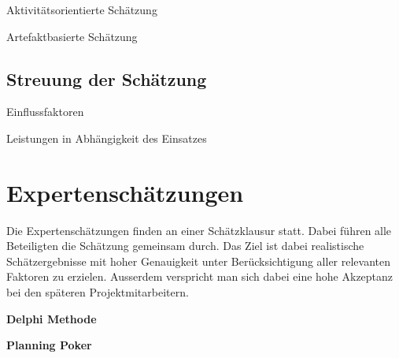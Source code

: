 \begin{minipage}{8cm}
	Aktivitätsorientierte Schätzung
\end{minipage}
\begin{minipage}{7cm}
	Artefaktbasierte Schätzung
\end{minipage}

\begin{figure}[ht]
	\centering
\end{figure}

\subsection{Streuung der Schätzung}

\begin{minipage}{8cm}
	Einflussfaktoren
\end{minipage}
\begin{minipage}{7cm}
	Leistungen in Abhängigkeit des Einsatzes
\end{minipage}

\begin{figure}[ht]
	\centering
\end{figure}

\section{Expertenschätzungen}
Die Expertenschätzungen finden an einer Schätzklausur statt. Dabei führen alle Beteiligten die Schätzung gemeinsam durch. Das Ziel ist dabei realistische Schätzergebnisse mit hoher Genauigkeit unter Berücksichtigung aller relevanten Faktoren zu erzielen. Ausserdem verspricht man sich dabei eine hohe Akzeptanz bei den späteren Projektmitarbeitern. 

\begin{minipage}{8cm}
	\textbf{Delphi Methode}
\end{minipage}
\begin{minipage}{7cm}
	\textbf{Planning Poker}
\end{minipage}

